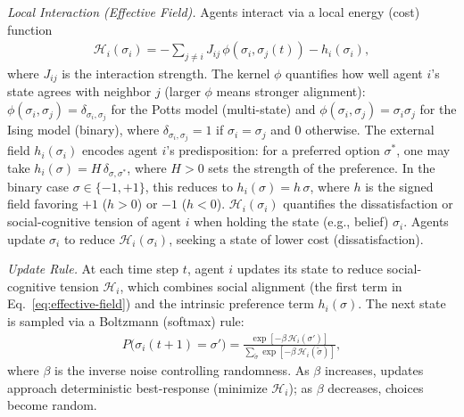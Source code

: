 \documentclass{article}
\theoremstyle{plain}
\theoremstyle{definition}
\theoremstyle{remark}
\begin{document}
{\sl Local Interaction (Effective Field). }
Agents interact via a local energy (cost) function
\begin{align}\label{eq:effective-field}
    \mathcal{H}_i(\sigma_i)
    = - \sum_{j\neq i} J_{ij}\,\phi(\sigma_i,\sigma_j(t)) - h_i(\sigma_i),
\end{align}
where $J_{ij}$ is the interaction strength. 
The kernel $\phi$ quantifies how well agent $i$'s state agrees with neighbor $j$ (larger $\phi$ means stronger alignment):
$\phi(\sigma_i,\sigma_j)=\delta_{\sigma_i,\sigma_j}$ for the Potts model (multi-state) and
$\phi(\sigma_i,\sigma_j)=\sigma_i\sigma_j$ for the Ising model (binary),
where $\delta_{\sigma_i,\sigma_j}=1$ if $\sigma_i=\sigma_j$ and $0$ otherwise. 
The external field $h_i(\sigma_i)$ encodes agent $i$'s predisposition: for a preferred option $\sigma^\ast$, one may take $h_i(\sigma)=H\,\delta_{\sigma,\sigma^\ast}$, where $H>0$ sets the strength of the preference.
In the binary case $\sigma\in\{-1,+1\}$, this reduces to $h_i(\sigma)=h\,\sigma$, where $h$ is the signed field favoring $+1$ ($h>0$) or $-1$ ($h<0$). 
$\mathcal{H}_i(\sigma_i)$ quantifies the dissatisfaction or social-cognitive tension of agent $i$ when holding the state (e.g., belief) $\sigma_i$. 
Agents update $\sigma_i$ to reduce $\mathcal{H}_i(\sigma_i)$, seeking a state of lower cost (dissatisfaction). 


{\sl Update Rule.}
At each time step $t$, agent $i$ updates its state to reduce social-cognitive tension $\mathcal{H}_i$, which combines social alignment (the first term in Eq.~\eqref{eq:effective-field}) and the intrinsic preference term $h_i(\sigma)$.
The next state is sampled via a Boltzmann (softmax) rule:
\begin{align}\label{eq:update-rule}
    P\bigl(\sigma_i(t+1)=\sigma'\bigr)
    = \frac{\exp\!\left[-\beta\, \mathcal{H}_i(\sigma')\right]}
    {\sum_{\tilde{\sigma}} \exp\!\left[-\beta\, \mathcal{H}_i(\tilde{\sigma})\right]},
\end{align}
where $\beta$ is the inverse noise controlling randomness.
As $\beta$ increases, updates approach deterministic best-response (minimize $\mathcal{H}_i$); as $\beta$ decreases, choices become random.
\end{document}
